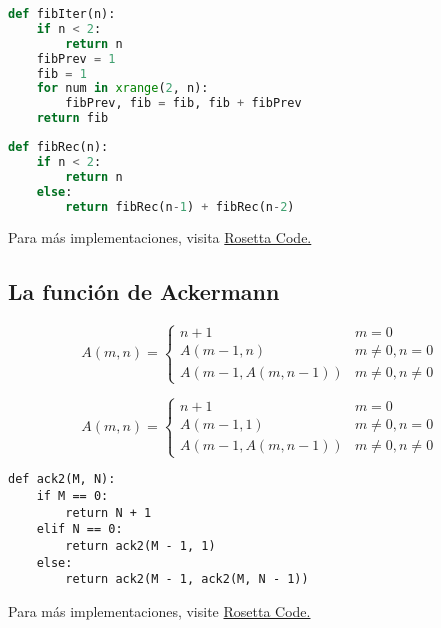 \begin{lstlisting}[language=Python, caption=Implentación iterativa de \emph{Fibonacci} en \texttt{Python}]		
def fibIter(n):
	if n < 2:
		return n
	fibPrev = 1
	fib = 1
	for num in xrange(2, n):
		fibPrev, fib = fib, fib + fibPrev
	return fib
\end{lstlisting}
	

\begin{lstlisting}[language=Python, caption=Implentación recursiva de \emph{Fibonacci} en \texttt{Python}]
def fibRec(n):
	if n < 2:
		return n
	else:
		return fibRec(n-1) + fibRec(n-2)
\end{lstlisting}

Para más implementaciones, visita \href{http://rosettacode.org/wiki/Fibonacci\_sequence}{Rosetta Code.}


\subsection{La función de Ackermann}


	\begin{definicion}
		$$
		A(m,n)=
		\begin{cases}
			n+1 & m=0\\
			A(m-1,n) & m\neq0, n=0 \\
			A(m-1, A(m,n-1)) & m\neq 0, n\neq 0
		\end{cases}
		$$
	\end{definicion}
	



	\begin{definicion}
		$$
		A(m,n)=
		\begin{cases}
			n+1 & m=0\\
			A(m-1,1) & m\neq0, n=0 \\
			A(m-1, A(m,n-1)) & m\neq 0, n\neq 0
		\end{cases}
		$$
	\end{definicion}
	


\begin{lstlisting}[caption=python, caption=Implentación recursiva de \emph{Ackermann} en \texttt{Python}]
def ack2(M, N):
	if M == 0:
		return N + 1
	elif N == 0:
		return ack2(M - 1, 1)
	else:
		return ack2(M - 1, ack2(M, N - 1))
\end{lstlisting}

Para más implementaciones, visite \href{http://rosettacode.org/wiki/Ackermann\_function}{Rosetta Code.}


